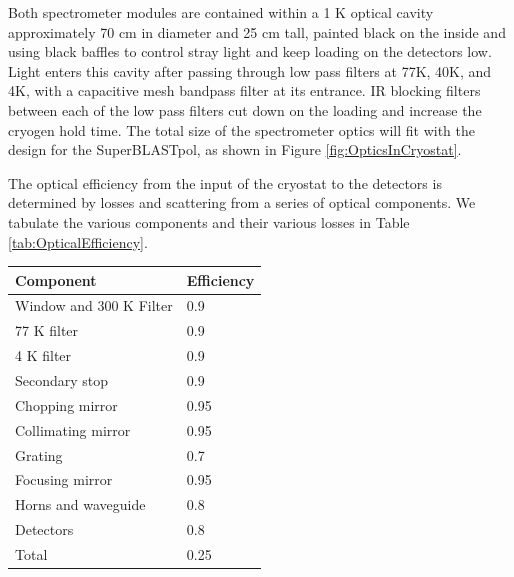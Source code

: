 Both spectrometer modules are contained within a 1 K optical cavity approximately 70 cm in diameter and 25 cm tall, painted black on the inside and using black baffles to control stray light and keep loading on the detectors low. Light enters this cavity after passing through low pass filters at 77K, 40K, and 4K, with a capacitive mesh bandpass filter at its entrance.  IR blocking
filters between each of the low pass filters cut down on the loading
and increase the cryogen hold time.  The total size of the spectrometer optics will fit with the design for the SuperBLASTpol, as shown in Figure \ref{fig:OpticsInCryostat}.

The optical efficiency from the input of the cryostat to the detectors is determined by losses and scattering from a series of optical components.  We tabulate the various components and their various losses in Table \ref{tab:OpticalEfficiency}.

\begin{center}
\begin{tabular}{ll}
Component & Efficiency \\
\hline
Window and 300 K Filter & 0.9 \\
77 K filter & 0.9 \\
4 K filter  & 0.9 \\
Secondary stop & 0.9 \\
Chopping mirror & 0.95 \\
Collimating mirror & 0.95 \\
Grating & 0.7 \\
Focusing mirror & 0.95 \\
Horns and waveguide & 0.8 \\
Detectors & 0.8 \\
\hline
Total & 0.25 
\end{tabular}
\end{center}



